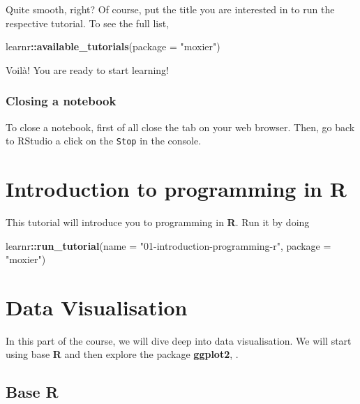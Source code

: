\documentclass[]{book}
\newenvironment{Shaded}{\begin{snugshade}}{\end{snugshade}}
\newcommand{\KeywordTok}[1]{\textcolor[rgb]{0.13,0.29,0.53}{\textbf{#1}}}
\newcommand{\DataTypeTok}[1]{\textcolor[rgb]{0.13,0.29,0.53}{#1}}
\newcommand{\StringTok}[1]{\textcolor[rgb]{0.31,0.60,0.02}{#1}}
\newcommand{\OperatorTok}[1]{\textcolor[rgb]{0.81,0.36,0.00}{\textbf{#1}}}
\newcommand{\NormalTok}[1]{#1}
\begin{document}
Quite smooth, right? Of course, put the title you are interested in to
run the respective tutorial. To see the full list,

\begin{Shaded}
\begin{Highlighting}[]
\NormalTok{learnr}\OperatorTok{::}\KeywordTok{available_tutorials}\NormalTok{(}\DataTypeTok{package =} \StringTok{"moxier"}\NormalTok{)}
\end{Highlighting}
\end{Shaded}

Voilà! You are ready to start learning!

\subsection{Closing a notebook}\label{closing-a-notebook}

To close a notebook, first of all close the tab on your web browser.
Then, go back to RStudio a click on the \texttt{Stop} in the console.

\chapter{Introduction to programming in
R}\label{introduction-to-programming-in-r}

This tutorial will introduce you to programming in \textbf{R}. Run it by
doing

\begin{Shaded}
\begin{Highlighting}[]
\NormalTok{learnr}\OperatorTok{::}\KeywordTok{run_tutorial}\NormalTok{(}\DataTypeTok{name =} \StringTok{"01-introduction-programming-r"}\NormalTok{,}
                     \DataTypeTok{package =} \StringTok{"moxier"}\NormalTok{)}
\end{Highlighting}
\end{Shaded}

\chapter{Data Visualisation}\label{data-visualisation}

In this part of the course, we will dive deep into data visualisation.
We will start using base \textbf{R} and then explore the package
\textbf{ggplot2}, \citep{R-ggplot2}.

\section{\texorpdfstring{Base \textbf{R}}{Base R}}\label{base-r}
\end{document}
